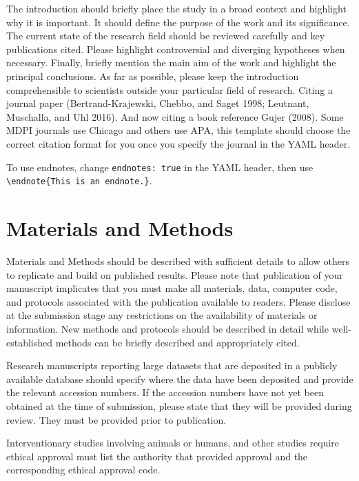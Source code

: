 \documentclass[
]{article}
\begin{document}
The introduction should briefly place the study in a broad context and highlight
why it is important. It should define the purpose of the work and its
significance. The current state of the research field should be reviewed
carefully and key publications cited. Please highlight controversial and
diverging hypotheses when necessary. Finally, briefly mention the main aim of
the work and highlight the principal conclusions. As far as possible, please
keep the introduction comprehensible to scientists outside your particular
field of research. Citing a journal paper (Bertrand-Krajewski, Chebbo, and Saget 1998; Leutnant, Muschalla, and Uhl 2016). And now citing a book reference Gujer (2008).
Some MDPI journals use Chicago and others use APA, this template should choose
the correct citation format for you once you specify the journal in the YAML
header.

To use endnotes, change \texttt{endnotes:\ true} in the YAML header, then use
\texttt{\textbackslash{}endnote\{This\ is\ an\ endnote.\}}.

\hypertarget{materials-and-methods}{%
\section{Materials and Methods}\label{materials-and-methods}}

Materials and Methods should be described with sufficient details to allow
others to replicate and build on published results. Please note that publication
of your manuscript implicates that you must make all materials, data, computer
code, and protocols associated with the publication available to readers. Please
disclose at the submission stage any restrictions on the availability of
materials or information. New methods and protocols should be described in
detail while well-established methods can be briefly described and appropriately
cited.

Research manuscripts reporting large datasets that are deposited in a publicly
available database should specify where the data have been deposited and provide
the relevant accession numbers. If the accession numbers have not yet been
obtained at the time of submission, please state that they will be provided
during review. They must be provided prior to publication.

Interventionary studies involving animals or humans, and other studies require
ethical approval must list the authority that provided approval and the
corresponding ethical approval code.
\end{document}
